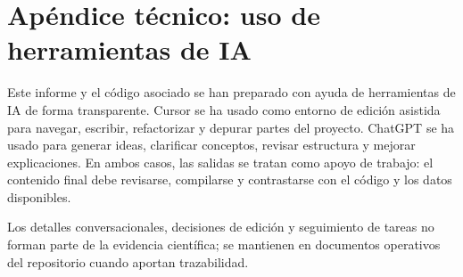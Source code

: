 \section{Apéndice técnico: uso de herramientas de IA}

Este informe y el código asociado se han preparado con ayuda de herramientas de IA de forma transparente. Cursor se ha usado como entorno de edición asistida para navegar, escribir, refactorizar y depurar partes del proyecto. ChatGPT se ha usado para generar ideas, clarificar conceptos, revisar estructura y mejorar explicaciones. En ambos casos, las salidas se tratan como apoyo de trabajo: el contenido final debe revisarse, compilarse y contrastarse con el código y los datos disponibles.

Los detalles conversacionales, decisiones de edición y seguimiento de tareas no forman parte de la evidencia científica; se mantienen en documentos operativos del repositorio cuando aportan trazabilidad.
